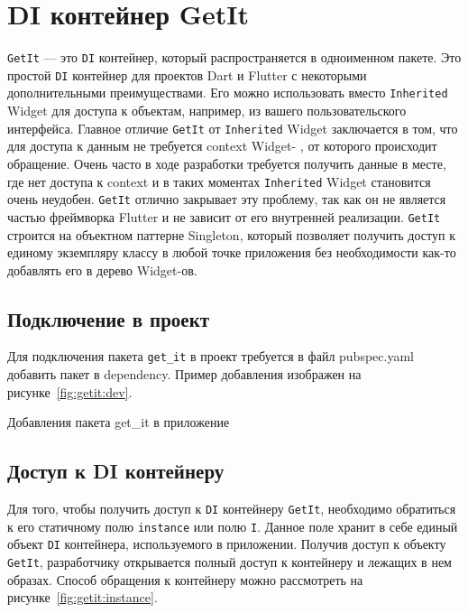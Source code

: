 \section{DI контейнер GetIt}

\texttt{GetIt} --- это \texttt{DI} контейнер,
который распространяется в одноименном пакете.
Это простой \texttt{DI} контейнер для проектов Dart
и Flutter с некоторыми дополнительными преимуществами.
Его можно использовать вместо \texttt{Inherited} Widget для доступа к объектам,
например, из вашего пользовательского интерфейса.
Главное отличие \texttt{GetIt} от \texttt{Inherited} Widget заключается в том,
что для доступа к данным не требуется context Widget-
, от которого происходит обращение.
Очень часто в ходе разработки требуется получить данные в месте,
где нет доступа к context
и в таких моментах \texttt{Inherited} Widget становится очень неудобен.
\texttt{GetIt} отлично закрывает эту проблему,
так как он не является частью фреймворка Flutter
и не зависит от его внутренней реализации.
\texttt{GetIt} строится на объектном паттерне Singleton,
который позволяет получить доступ к единому экземпляру классу
в любой точке приложения без необходимости
как-то добавлять его в дерево Widget-ов.

\subsection{Подключение в проект}

Для подключения пакета \texttt{get\_it} в проект требуется
в файл pubspec.yaml добавить пакет в dependency.
Пример добавления изображен на рисунке~\ref{fig:getit:dev}.

\begin{image}
	\caption{Добавления пакета get\_it в приложение}
	\label{fig:getit:dev}
\end{image}

\subsection{Доступ к DI контейнеру}

Для того, чтобы получить доступ к \texttt{DI} контейнеру \texttt{GetIt},
необходимо обратиться к его статичному полю \texttt{instance}
или полю \texttt{I}.
Данное поле хранит в себе единый объект \texttt{DI} контейнера,
используемого в приложении. Получив доступ к объекту \texttt{GetIt},
разработчику открывается полный доступ к контейнеру и лежащих в нем образах.
Способ обращения к контейнеру
можно рассмотреть на рисунке~\ref{fig:getit:instance}.

